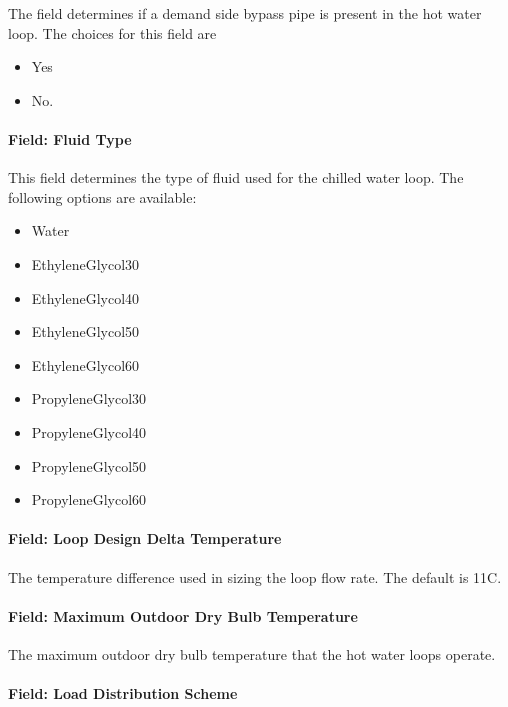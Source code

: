 The field determines if a demand side bypass pipe is present in the hot water loop. The choices for this field are

\begin{itemize}
\item
  Yes
\item
  No.
\end{itemize}

\paragraph{Field: Fluid Type}\label{field-fluid-type-1}

This field determines the type of fluid used for the chilled water loop. The following options are available:

\begin{itemize}
\item
  Water
\item
  EthyleneGlycol30
\item
  EthyleneGlycol40
\item
  EthyleneGlycol50
\item
  EthyleneGlycol60
\item
  PropyleneGlycol30
\item
  PropyleneGlycol40
\item
  PropyleneGlycol50
\item
  PropyleneGlycol60
\end{itemize}

\paragraph{Field: Loop Design Delta Temperature}\label{field-loop-design-delta-temperature-1}

The temperature difference used in sizing the loop flow rate. The default is 11C.

\paragraph{Field: Maximum Outdoor Dry Bulb Temperature}\label{field-maximum-outdoor-dry-bulb-temperature}

The maximum outdoor dry bulb temperature that the hot water loops operate.

\paragraph{Field: Load Distribution Scheme}\label{field-load-distribution-scheme}

